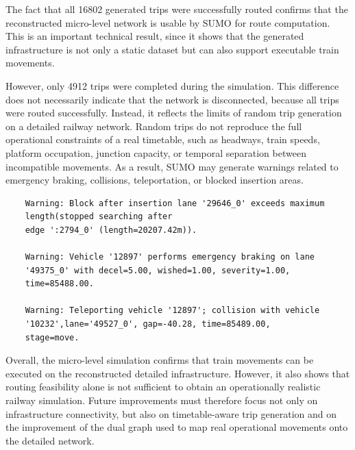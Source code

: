 
\newpage

The fact that all 16802 generated trips were successfully routed confirms that the reconstructed micro-level network is 
usable by SUMO for route computation. This is an important technical result, since it shows that the generated 
infrastructure is not only a static dataset but can also support executable train movements.

However, only 4912 trips were completed during the simulation. This difference does not necessarily indicate that the 
network is disconnected, because all trips were routed successfully. Instead, it reflects the limits of random trip 
generation on a detailed railway network. Random trips do not reproduce the full operational constraints of a real 
timetable, such as headways, train speeds, platform occupation, junction capacity, or temporal separation between 
incompatible movements. As a result, SUMO may generate warnings related to emergency braking, collisions, teleportation, 
or blocked insertion areas.

\begin{lstlisting}
    Warning: Block after insertion lane '29646_0' exceeds maximum 
    length(stopped searching after 
    edge ':2794_0' (length=20207.42m)).
    
    Warning: Vehicle '12897' performs emergency braking on lane 
    '49375_0' with decel=5.00, wished=1.00, severity=1.00, 
    time=85488.00.
    
    Warning: Teleporting vehicle '12897'; collision with vehicle 
    '10232',lane='49527_0', gap=-40.28, time=85489.00, 
    stage=move.
\end{lstlisting}

Overall, the micro-level simulation confirms that train movements can be executed on the reconstructed detailed 
infrastructure. However, it also shows that routing feasibility alone is not sufficient to obtain an operationally 
realistic railway simulation. Future improvements must therefore focus not only on infrastructure connectivity, but also 
on timetable-aware trip generation and on the improvement of the dual graph used to map real operational movements onto 
the detailed network.

